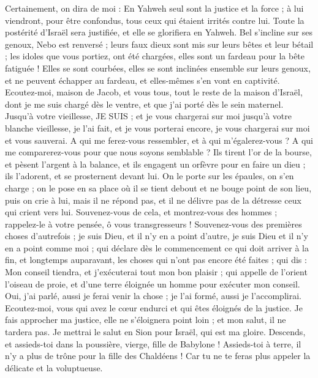 \begin{multicols}{2}
Certainement, on dira de moi : En Yahweh seul sont la justice et la force ; à lui viendront, pour être confondus, tous ceux qui étaient irrités contre lui.
Toute la postérité d'Israël sera justifiée, et elle se glorifiera en Yahweh.
\VerseOne{}Bel s'incline sur ses genoux, Nebo est renversé ; leurs faux dieux sont mis sur leurs bêtes et leur bétail ; les idoles que vous portiez, ont été chargées, elles sont un fardeau pour la bête fatiguée !
Elles se sont courbées, elles se sont inclinées ensemble sur leurs genoux, et ne peuvent échapper au fardeau, et elles-mêmes s'en vont en captivité.
Ecoutez-moi, maison de Jacob, et vous tous, tout le reste de la maison d'Israël, dont je me suis chargé dès le ventre, et que j'ai porté dès le sein maternel.
Jusqu'à votre vieillesse, JE SUIS ; et je vous chargerai sur moi jusqu'à votre blanche vieillesse, je l'ai fait, et je vous porterai encore, je vous chargerai sur moi et vous sauverai.
A qui me ferez-vous ressembler, et à qui m'égalerez-vous ? A qui me comparerez-vous pour que nous soyons semblable ? 
Ils tirent l'or de la bourse, et pèsent l'argent à la balance, et ils engagent un orfèvre pour en faire un dieu ; ils l'adorent, et se prosternent devant lui.
On le porte sur les épaules, on s'en charge ; on le pose en sa place où il se tient debout et ne bouge point de son lieu, puis on crie à lui, mais il ne répond pas, et il ne délivre pas de la détresse ceux qui crient vers lui.
Souvenez-vous de cela, et montrez-vous des hommes ; rappelez-le à votre pensée, ô vous transgresseurs !
Souvenez-vous des premières choses d'autrefois ; je suis Dieu, et il n'y en a point d'autre, je suis Dieu et il n'y en a point comme moi ;
qui déclare dès le commencement ce qui doit arriver à la fin, et longtemps auparavant, les choses qui n'ont pas encore été faites ; qui dis : Mon conseil tiendra, et j'exécuterai tout mon bon plaisir ;
qui appelle de l'orient l'oiseau de proie, et d'une terre éloignée un homme pour exécuter mon conseil. Oui, j'ai parlé, aussi je ferai venir la chose ; je l'ai formé, aussi je l'accomplirai. 
Ecoutez-moi, vous qui avez le cœur endurci et qui êtes éloignés de la justice.
Je fais approcher ma justice, elle ne s'éloignera point loin ; et mon salut, il ne tardera pas. Je mettrai le salut en Sion pour Israël, qui est ma gloire.
\VerseOne{}Descends, et assieds-toi dans la poussière, vierge, fille de Babylone ! Assieds-toi à terre, il n'y a plus de trône pour la fille des Chaldéens ! Car tu ne te feras plus appeler la délicate et la voluptueuse.

\end{multicols}
